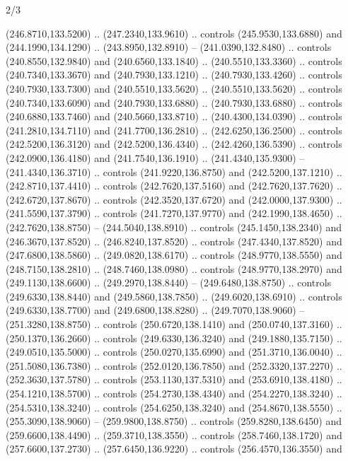 \begin{flagdescription}{2/3}
\begin{scope}[xshift=0.5\flaglength,yshift=0.5\flagwidth,scale=\flagwidth/259.2]
\begin{scope}[y=0.8pt, x=0.8pt, yscale=-1,shift={(-243,-162)}]
      (246.8710,133.5200) .. (247.2340,133.9610) .. controls (245.9530,133.6880) and
      (244.1990,134.1290) .. (243.8950,132.8910) -- (241.0390,132.8480) .. controls
      (240.8550,132.9840) and (240.6560,133.1840) .. (240.5510,133.3360) .. controls
      (240.7340,133.3670) and (240.7930,133.1210) .. (240.7930,133.4260) .. controls
      (240.7930,133.7300) and (240.5510,133.5620) .. (240.5510,133.5620) .. controls
      (240.7340,133.6090) and (240.7930,133.6880) .. (240.7930,133.6880) .. controls
      (240.6880,133.7460) and (240.5660,133.8710) .. (240.4300,134.0390) .. controls
      (241.2810,134.7110) and (241.7700,136.2810) .. (242.6250,136.2500) .. controls
      (242.5200,136.3120) and (242.5200,136.4340) .. (242.4260,136.5390) .. controls
      (242.0900,136.4180) and (241.7540,136.1910) .. (241.4340,135.9300) --
      (241.4340,136.3710) .. controls (241.9220,136.8750) and (242.5200,137.1210) ..
      (242.8710,137.4410) .. controls (242.7620,137.5160) and (242.7620,137.7620) ..
      (242.6720,137.8670) .. controls (242.3520,137.6720) and (242.0000,137.9300) ..
      (241.5590,137.3790) .. controls (241.7270,137.9770) and (242.1990,138.4650) ..
      (242.7620,138.8750) -- (244.5040,138.8910) .. controls (245.1450,138.2340) and
      (246.3670,137.8520) .. (246.8240,137.8520) .. controls (247.4340,137.8520) and
      (247.6800,138.5860) .. (249.0820,138.6170) .. controls (248.9770,138.5550) and
      (248.7150,138.2810) .. (248.7460,138.0980) .. controls (248.9770,138.2970) and
      (249.1130,138.6600) .. (249.2970,138.8440) -- (249.6480,138.8750) .. controls
      (249.6330,138.8440) and (249.5860,138.7850) .. (249.6020,138.6910) .. controls
      (249.6330,138.7700) and (249.6800,138.8280) .. (249.7070,138.9060) --
      (251.3280,138.8750) .. controls (250.6720,138.1410) and (250.0740,137.3160) ..
      (250.1370,136.2660) .. controls (249.6330,136.3240) and (249.1880,135.7150) ..
      (249.0510,135.5000) .. controls (250.0270,135.6990) and (251.3710,136.0040) ..
      (251.5080,136.7380) .. controls (252.0120,136.7850) and (252.3320,137.2270) ..
      (252.3630,137.5780) .. controls (253.1130,137.5310) and (253.6910,138.4180) ..
      (254.1210,138.5700) .. controls (254.2730,138.4340) and (254.2270,138.3240) ..
      (254.5310,138.3240) .. controls (254.6250,138.3240) and (254.8670,138.5550) ..
      (255.3090,138.9060) -- (259.9800,138.8750) .. controls (259.8280,138.6450) and
      (259.6600,138.4490) .. (259.3710,138.3550) .. controls (258.7460,138.1720) and
      (257.6600,137.2730) .. (257.6450,136.9220) .. controls (256.4570,136.3550) and

\end{scope}
\end{scope}
\end{flagdescription}
